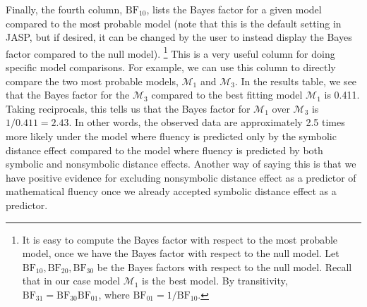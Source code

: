 \documentclass[english,,doc,floatsintext]{apa6}
\begin{document}
Finally, the fourth column, \(\text{BF}_{10}\), lists the Bayes factor for a given model compared to the most probable model (note that this is the default setting in JASP, but if desired, it can be changed by the user to instead display the Bayes factor compared to the null model).
\footnote{It is easy to compute the Bayes factor with respect to the most probable model, once we have the Bayes factor with respect to the null model. Let \( \text{BF}_{10}, \text{BF}_{20}, \text{BF}_{30} \) be the Bayes factors with respect to the null model. Recall that in our case model \( \mathcal{M}_{1} \) is the best model. By transitivity, \( \text{BF}_{31} =\text{BF}_{30} \text{BF}_{01} \), where \( \text{BF}_{01}= 1/\text{BF}_{10} \).}
This is a very useful column for doing specific model comparisons. For example, we can use this column to directly compare the two most probable models, \(\mathcal{M}_{1}\) and \(\mathcal{M}_{3}\). In the results table, we see that the Bayes factor for the \(\mathcal{M}_{3}\) compared to the best fitting model \(\mathcal{M}_{1}\) is 0.411. Taking reciprocals, this tells us that the Bayes factor for \(\mathcal{M}_{1}\) over \(\mathcal{M}_{3}\) is \(1/0.411 = 2.43\). In other words, the observed data are approximately 2.5 times more likely under the model where fluency is predicted only by the symbolic distance effect compared to the model where fluency is predicted by both symbolic and nonsymbolic distance effects. Another way of saying this is that we have positive evidence for excluding nonsymbolic distance effect as a predictor of mathematical fluency once we already accepted symbolic distance effect as a predictor.
\end{document}

